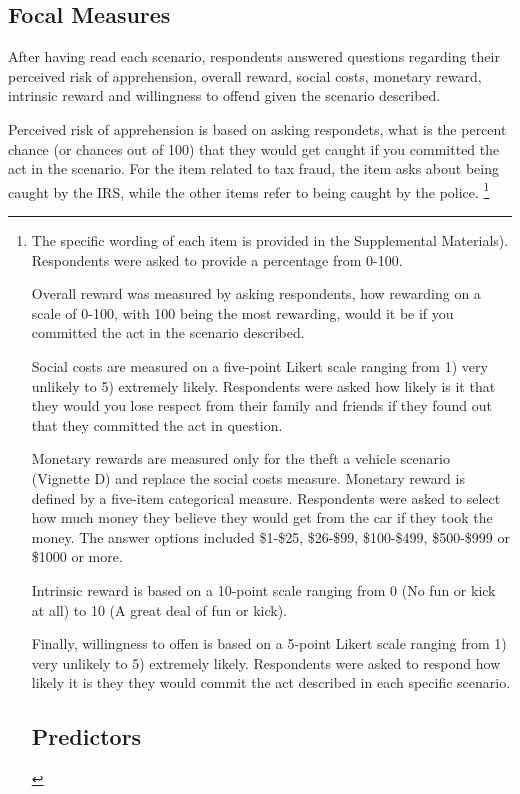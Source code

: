 \documentclass{article} %
\begin{document}
\begin{enumerate}[A]
\subsection{Focal Measures}

After having read each scenario, respondents answered questions regarding their perceived risk of apprehension, overall reward, social costs, monetary reward, intrinsic reward and willingness to offend given the scenario described. 

Perceived risk of apprehension is based on asking respondets, what is the percent chance (or chances out of 100) that they would get caught if you committed the act in the scenario. For the item related to tax fraud, the item asks about being caught by the IRS, while the other items refer to being caught by the police. \footnote{The specific wording of each item is provided in the Supplemental Materials). Respondents were asked to provide a percentage from 0-100. 

Overall reward was measured by asking respondents, how rewarding on a scale of 0-100, with 100 being the most rewarding, would it be if you committed the act in the scenario described. 

Social costs are measured on a five-point Likert scale ranging from 1) very unlikely to 5) extremely likely. Respondents were asked how likely is it that they would you lose respect from their family and friends if they found out that they committed the act in question.

Monetary rewards are measured only for the theft a vehicle scenario (Vignette D) and replace the social costs measure. Monetary reward is defined by a five-item categorical measure. Respondents were asked to select how much money they believe they would get from the car if they took the money. The answer options included \$1-\$25, \$26-\$99, \$100-\$499, \$500-\$999 or \$1000 or more. 

Intrinsic reward is based on a 10-point scale ranging from 0 (No fun or kick at all) to 10 (A great deal of fun or kick). 

Finally, willingness to offen is based on a 5-point Likert scale ranging from 1) very unlikely to 5) extremely likely. Respondents were asked to respond how likely it is they they would commit the act described in each specific scenario. 


\subsection{Predictors}

}
\end{enumerate}
\end{document}
